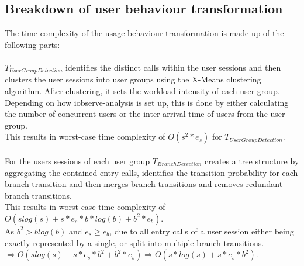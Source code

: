 \documentclass[10pt,a4paper]{article}
\begin{document}
	\subsection{Breakdown of user behaviour transformation}
	The time complexity of the usage behaviour transformation is made up of the following parts:\\
	\\
    $T_{UserGroupDetection}$ identifies the distinct calls within the user sessions and then clusters the user sessions into user groups using the X-Means clustering algorithm. After clustering, it sets the workload intensity of each user group. Depending on how iobserve-analysis is set up, this is done by either calculating the number of concurrent users or the inter-arrival time of users from the user group.\\
    This results in worst-case time complexity of $O(s^{2}*e_s)$ for $T_{UserGroupDetection}$.\\
	\\
	For the users sessions of each user group $T_{BranchDetection}$ creates a tree structure by aggregating the contained entry calls, identifies the transition probability for each branch transition and then merges branch transitions and removes redundant branch transitions.\\
	This results in worst case time complexity of $O(slog(s) + s*e_s*b*log(b) + b^2*e_b)$.\\
	As $b^2 > blog(b)$ and $e_s \geq e_b$, due to all entry calls of a user session either being exactly represented by a single, or split into multiple branch transitions.\\
	$\Rightarrow O(slog(s) + s*e_s*b^2 + b^2*e_s) \Rightarrow O(s*log(s) + s*e_s*b^2)$.\\
\end{document}
